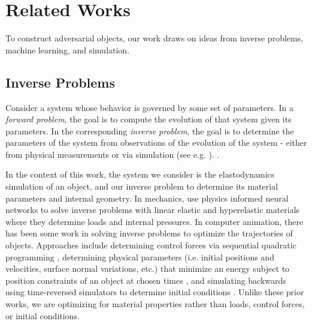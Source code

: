\section{Related Works}\label{sec:Related Works}
To construct adversarial objects, our work draws on ideas from inverse problems, machine learning, and simulation.

\subsection{Inverse Problems}
Consider a system whose behavior is governed by some set of parameters. In a \textit{forward problem}, the goal is to compute the evolution of that system given its parameters. In the corresponding \textit{inverse problem}, the goal is to determine the parameters of the system from observations of the evolution of the system - either from physical measurements or via simulation (see e.g. \cite{inverse-problems-book1, inverse-problems-book2}). 
.

In the context of this work, the system we consider is the elastodynamics simulation of an object, and our inverse problem to determine its material parameters and internal geometry.
In mechanics, \citet{XU2023115852} use physics informed neural networks to solve inverse problems with linear elastic and hyperelastic materials where they determine loads and internal pressures.
In computer animation, there has been some work in solving inverse problems to optimize the trajectories of objects. Approaches include determining control forces via sequential quadratic programming \cite{spacetime-constraints}, determining physical parameters (i.e. initial positions and velocities, surface normal variations, etc.) that minimize an energy subject to position constraints of an object at chosen times \cite{popovic2000interactive}, and simulating backwards using time-reversed simulators to determine initial conditions \cite{backward-rigid-body}. Unlike these prior works, we are optimizing for material properties rather than loads, control forces, or initial conditions.

